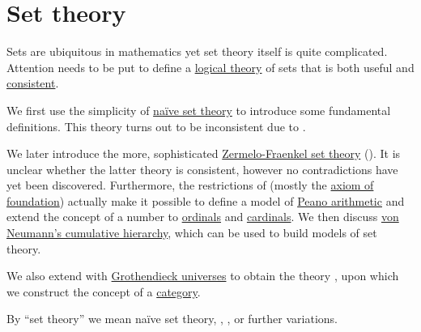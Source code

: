 \section{Set theory}\label{sec:set_theory}

Sets are ubiquitous in mathematics yet set theory itself is quite complicated. Attention needs to be put to define a \hyperref[def:first_order_theory]{logical theory} of sets that is both useful and \hyperref[def:first_order_theory/consistent]{consistent}.

We first use the simplicity of \hyperref[def:naive_set_theory]{na\"ive set theory} to introduce some fundamental definitions. This theory turns out to be inconsistent due to .

We later introduce the more, sophisticated \hyperref[def:zfc]{Zermelo-Fraenkel set theory} (). It is unclear whether the latter theory is consistent, however no contradictions have yet been discovered. Furthermore, the restrictions of  (mostly the \hyperref[def:zfc/foundation]{axiom of foundation}) actually make it possible to define a model of \hyperref[def:peano_arithmetic]{Peano arithmetic} and extend the concept of a number to \hyperref[def:ordinal]{ordinals} and \hyperref[def:cardinal]{cardinals}. We then discuss \hyperref[def:cumulative_hierarchy]{von Neumann's cumulative hierarchy}, which can be used to build models of set theory.

We also extend  with \hyperref[def:grothendieck_universe]{Grothendieck universes} to obtain the theory \hyperref[def:axiom_of_universes]{}, upon which we construct the concept of a \hyperref[def:category]{category}.

By \enquote{set theory} we mean na\"ive set theory, , ,  or further variations.

